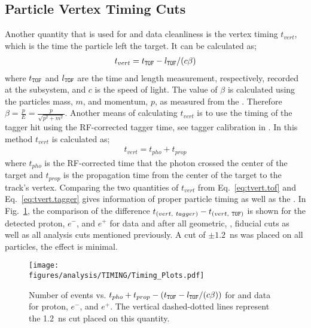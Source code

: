 \subsection{Particle Vertex Timing Cuts}\label{sec:analysis.timing}
Another quantity that is used for  and data cleanliness is the vertex timing $t_{vert}$, which is the time the particle left the target. It can be calculated as;
\begin{align}
t_{vert}= t_{\textsc{\texttt{TOF}}} -  l_{\textsc{\texttt{TOF}}}/(c\beta) \label{eq:tvert.tof}
\end{align}
where $t_{\textsc{\texttt{TOF}}}$ and $l_{\textsc{\texttt{TOF}}}$ are the time and length measurement, respectively, recorded at the  subsystem, and $c$ is the speed of light. The value of $\beta$ is calculated using the particles mass, $m$, and momentum, $p$, as measured from the . Therefore $\beta = \frac{p}{E} = \frac{p}{\sqrt{p^2+m^2}}$. Another means of calculating $t_{vert}$ is to use the timing of the tagger hit using the RF-corrected tagger time, see tagger calibration in \cite{g12note}. In this method $t_{vert}$ is calculated as;
\begin{align}
t_{vert}=t_{pho} + t_{prop} \label{eq:tvert.tagger}
\end{align}
where $t_{pho}$ is the RF-corrected time that the photon crossed the center of the target and $t_{prop}$ is the propagation time from the center of the target to the track's vertex. Comparing the two quantities of $t_{vert}$ from Eq.~\ref{eq:tvert.tof} and Eq.~\ref{eq:tvert.tagger} gives information of proper particle timing as well as the . In Fig.~\ref{fig:timing.all}, the comparison of the difference $t_{(vert, \ tagger)} - t_{(vert,\ \abbr{TOF})}$ is shown for the detected proton, $e^-$, and $e^+$ for data and  after all geometric, ,  fiducial cuts as well as all analysis cuts mentioned previously. A cut of $\pm 1.2$~ns was placed on all particles, the effect is minimal.


\begin{figure}[h!]\begin{center}
\texttt{[image: \\figures/analysis/TIMING/Timing\_Plots.pdf]}
\caption[Number of events vs. $t_{pho} + t_{prop} - (t_{\abbr{TOF}} -  l_{\abbr{TOF}}/(c\beta))$ for  and data for proton, $e^-$, and $e^+$]{\label{fig:timing.all}Number of events vs. $t_{pho} + t_{prop} - (t_{\abbr{TOF}} -  l_{\abbr{TOF}}/(c\beta))$ for  and data for proton, $e^-$, and $e^+$. The vertical dashed-dotted lines represent the 1.2~ns cut placed on this quantity.}
\end{center}\end{figure}

